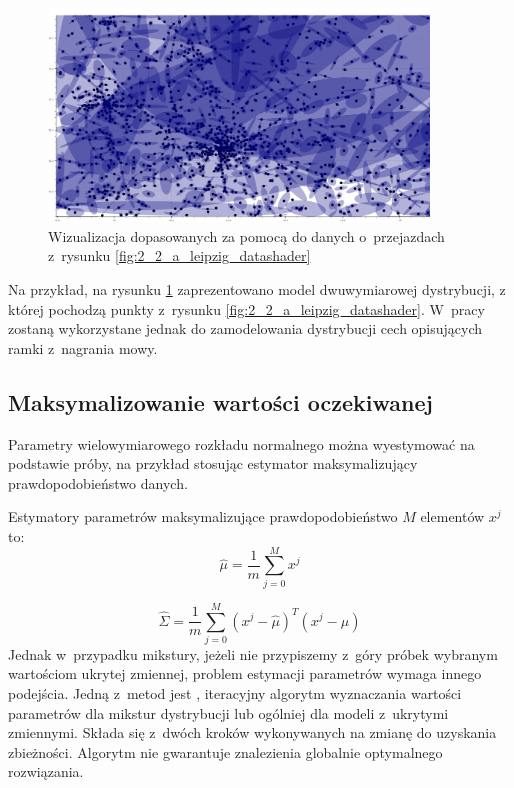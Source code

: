 \begin{figure}[H]
    \centering
    \includegraphics[width=0.9\textwidth]{images/2_2_a_leipzig_gmm}
    \caption{Wizualizacja  dopasowanych za pomocą  do danych o~przejazdach z~rysunku \ref{fig:2_2_a_leipzig_datashader}}
    \label{fig:2_2_a_leipzig_gmm}
\end{figure}

Na przykład, na rysunku \ref{fig:2_2_a_leipzig_gmm} zaprezentowano model  dwuwymiarowej dystrybucji,
z której pochodzą punkty z~rysunku \ref{fig:2_2_a_leipzig_datashader}. W~pracy  zostaną wykorzystane
jednak do zamodelowania dystrybucji cech opisujących ramki z~nagrania mowy.

\subsection{Maksymalizowanie wartości oczekiwanej}\label{sec:expectation_maximization}

Parametry wielowymiarowego rozkładu normalnego można wyestymować na podstawie próby, na przykład
stosując estymator maksymalizujący prawdopodobieństwo danych.

Estymatory parametrów maksymalizujące prawdopodobieństwo $M$ elementów $x^j$ to:
$$\hat{\mu} = \frac{1}{m} \sum_{j=0}^M x^{j}$$

$$\hat{\Sigma} = \frac{1}{m} \sum_{j=0}^M (x^{j} - \hat{\mu})^T (x^{j} - \hat{\mu})$$
Jednak w~przypadku mikstury, jeżeli nie przypiszemy z~góry próbek wybranym wartościom ukrytej zmiennej, problem
estymacji parametrów wymaga innego podejścia. Jedną z~metod jest , iteracyjny
algorytm wyznaczania wartości parametrów dla mikstur dystrybucji lub ogólniej dla modeli z~ukrytymi zmiennymi.
Składa się z~dwóch kroków wykonywanych na zmianę do uzyskania zbieżności.  Algorytm nie gwarantuje znalezienia
globalnie optymalnego rozwiązania.

